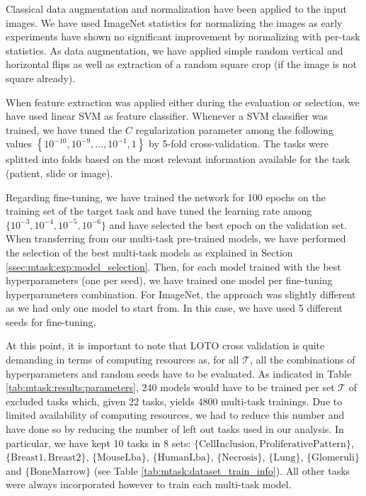 Classical data augmentation and normalization have been applied to the input images. We have used ImageNet statistics for normalizing the images as early experiments have shown no significant improvement by normalizing with per-task statistics. As data augmentation, we have applied simple random vertical and horizontal flips as well as extraction of a random square crop (if the image is not square already).

When feature extraction was applied either during the evaluation or selection, we have used linear SVM \cite{fan2008liblinear} as feature classifier. Whenever a SVM classifier was trained, we have tuned the $C$ regularization parameter among the following values $\left\{10^{-10}, 10^{-9},...,10^{-1},1\right\}$ by 5-fold cross-validation. The tasks were splitted into folds based on the most relevant information available for the task (patient, slide or image).

Regarding fine-tuning, we have trained the network for 100 epochs on the training set of the target task and have tuned the learning rate among $\{10^{-3}, 10^{-4}, 10^{-5}, 10^{-6}\}$ and have selected the best epoch on the validation set. When transferring from our multi-task pre-trained models, we have performed the selection of the best multi-task models as explained in Section \ref{ssec:mtask:exp:model_selection}. Then, for each model trained with the best hyperparameters (\ie one per seed), we have trained one model per fine-tuning hyperparameters combination. For ImageNet, the approach was slightly different as we had only one model to start from. In this case, we have used 5 different seeds for fine-tuning. 

At this point, it is important to note that LOTO cross validation is quite demanding in terms of computing resources as, for all $\mathcal{T}$, all the combinations of hyperparameters and random seeds have to be evaluated. As indicated in Table \ref{tab:mtask:results:parameters}, 240 models would have to be trained per set $\mathcal{T}$ of excluded tasks which, given 22 tasks, yields 4800 multi-task trainings. Due to limited availability of computing resources, we had to reduce this number and have done so by reducing the number of left out tasks used in our analysis. In particular, we have kept 10 tasks in 8 sets: $\{\text{CellInclusion}, \text{ProliferativePattern}\}$, $\{\text{Breast1}, \text{Breast2}\}$, $\{\text{MouseLba}\}$, $\{\text{HumanLba}\}$, $\{\text{Necrosis}\}$, $\{\text{Lung}\}$, $\{\text{Glomeruli}\}$ and $\{\text{BoneMarrow}\}$ (see Table \ref{tab:mtask:dataset_train_info}). All other tasks were always incorporated however to train each multi-task model.

